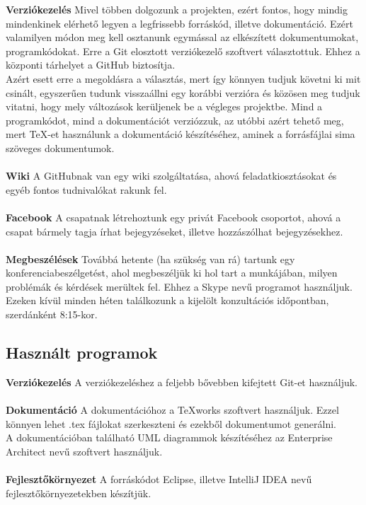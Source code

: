\textbf{Verziókezelés} Mivel többen dolgozunk a projekten, ezért fontos, hogy mindig mindenkinek elérhető legyen a legfrissebb forráskód, illetve dokumentáció. Ezért valamilyen módon meg kell osztanunk egymással az elkészített dokumentumokat, programkódokat. Erre a Git elosztott verziókezelő szoftvert választottuk. Ehhez a központi tárhelyet a GitHub biztosítja. \\
Azért esett erre a megoldásra a választás, mert így könnyen tudjuk követni ki mit csinált, egyszerűen tudunk visszaállni egy korábbi verzióra és közösen meg tudjuk vitatni, hogy mely változások kerüljenek be a végleges projektbe.
Mind a programkódot, mind a dokumentációt verziózzuk, az utóbbi azért tehető meg, mert TeX-et használunk a dokumentáció készítéséhez, aminek a forrásfájlai sima szöveges dokumentumok.
\\ \\
\textbf{Wiki}
A GitHubnak van egy wiki szolgáltatása, ahová feladatkiosztásokat és egyéb fontos tudnivalókat rakunk fel. \\ \\
\textbf{Facebook}
A csapatnak létrehoztunk egy privát Facebook csoportot, ahová a csapat bármely tagja írhat bejegyzéseket, illetve hozzászólhat bejegyzésekhez. \\ \\
\textbf{Megbeszélések}
Továbbá hetente (ha szükség van rá) tartunk egy konferenciabeszélgetést, ahol megbeszéljük ki hol tart a munkájában, milyen problémák és kérdések merültek fel. Ehhez a Skype nevű programot használjuk. \\
Ezeken kívül minden héten találkozunk a kijelölt konzultációs időpontban, szerdánként 8:15-kor.

\subsection{Használt programok}
\textbf{Verziókezelés}
A verziókezeléshez a feljebb bővebben kifejtett Git-et használjuk. \\ \\
\textbf{Dokumentáció}
A dokumentációhoz a TeXworks szoftvert használjuk. Ezzel könnyen lehet .tex fájlokat szerkeszteni és ezekből dokumentumot generálni. \\
A dokumentációban található UML diagrammok készítéséhez az Enterprise Architect nevű szoftvert használjuk. \\ \\
\textbf{Fejlesztőkörnyezet}
A forráskódot Eclipse, illetve IntelliJ IDEA nevű fejlesztőkörnyezetekben készítjük.

